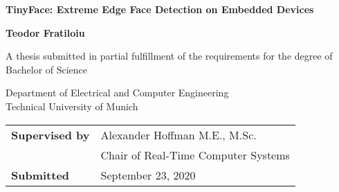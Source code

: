    \begin{center}
        \vspace*{1cm}
        \begin{flushleft}
            \Huge
            \textbf{TinyFace: Extreme Edge Face Detection on Embedded Devices}
            
            \vspace{300 pt}
            \huge
            \textbf{Teodor Fratiloiu}
            
            \vspace{30 pt}
            
            \large
            A thesis submitted in partial fulfillment of the requirements for the degree of Bachelor of Science \\
            \vspace{30 pt}

            \Large
            Department of Electrical and Computer Engineering \\
            Technical University of Munich
            \vspace{30 pt}
            
            \large
            \begin{tabular}{ l l }
                 \textbf{Supervised by\hspace{75 pt}} & Alexander Hoffman M.E., M.Sc. \\  
                                        & Chair of Real-Time Computer Systems \\
                 \textbf{Submitted \hspace{75 pt}} &  September 23, 2020    
            \end{tabular}
         
        \end{flushleft}
   \end{center}